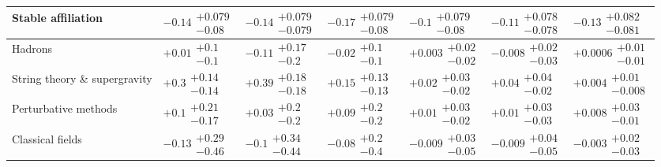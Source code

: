 \begin{tabular}{lllllll}
\textbf{Stable affiliation}               &   $\bm{-0.14}\substack{+0.079 \\ -0.08}$ &  $\bm{-0.14}\substack{+0.079 \\ -0.079}$ &   $\bm{-0.17}\substack{+0.079 \\ -0.08}$ &    $\bm{-0.1}\substack{+0.079 \\ -0.08}$ &  $\bm{-0.11}\substack{+0.078 \\ -0.078}$ &  $\bm{-0.13}\substack{+0.082 \\ -0.081}$ \\
\hline Hadrons                                   &           $+0.01\substack{+0.1 \\ -0.1}$ &          $-0.11\substack{+0.17 \\ -0.2}$ &           $-0.02\substack{+0.1 \\ -0.1}$ &        $+0.003\substack{+0.02 \\ -0.02}$ &        $-0.008\substack{+0.02 \\ -0.03}$ &       $+0.0006\substack{+0.01 \\ -0.01}$ \\
String theory \& supergravity             &     $\bm{+0.3}\substack{+0.14 \\ -0.14}$ &    $\bm{+0.39}\substack{+0.18 \\ -0.18}$ &    $\bm{+0.15}\substack{+0.13 \\ -0.13}$ &    $\bm{+0.02}\substack{+0.03 \\ -0.02}$ &    $\bm{+0.04}\substack{+0.04 \\ -0.02}$ &       $+0.004\substack{+0.01 \\ -0.008}$ \\
Perturbative methods                      &          $+0.1\substack{+0.21 \\ -0.17}$ &           $+0.03\substack{+0.2 \\ -0.2}$ &           $+0.09\substack{+0.2 \\ -0.2}$ &         $+0.01\substack{+0.03 \\ -0.02}$ &         $+0.01\substack{+0.03 \\ -0.03}$ &        $+0.008\substack{+0.03 \\ -0.01}$ \\
Classical fields                          &         $-0.13\substack{+0.29 \\ -0.46}$ &          $-0.1\substack{+0.34 \\ -0.44}$ &           $-0.08\substack{+0.2 \\ -0.4}$ &        $-0.009\substack{+0.03 \\ -0.05}$ &        $-0.009\substack{+0.04 \\ -0.05}$ &        $-0.003\substack{+0.02 \\ -0.03}$ \\

\end{tabular}
